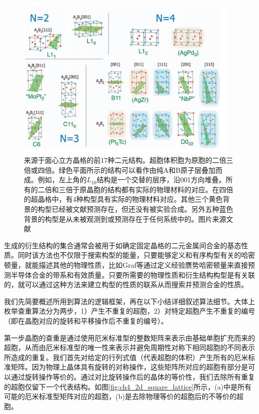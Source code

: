 \begin{figure}
  \includegraphics[width=0.96\textwidth]{figs/ch4_fcc_234_ss.png}
  \centering
  \caption{来源于面心立方晶格的前17种二元结构。超胞体积胞为原胞的二倍三倍或四倍。绿色平面所示的结构可以看作由纯A和B原子层叠加而成。例如，左上角的$L_{10}$结构是一个交替的层序，沿001方向堆叠。所有的二倍和三倍于原晶胞的结构都有实际的物理材料的对应。在四倍的超晶格中，有4种构型具有实际的物理材料对应。其他三个黄色背景的构型已经被文献\cite{curtarolo2005accuracy}预测存在，但还没有被实验合成。另外五种蓝色背景的构型是从未被观测到或预测存在于任何系统中的。图片来源文献\cite{hart2008algorithm}}
  \label{fig:ch4_fcc_234_ss}
\end{figure}

生成的衍生结构的集合通常会被用于如确定固定晶格的二元金属间合金的基态性质。同时该方法也不仅限于搜索构型的能量，只要能够定义和有序构型有关的哈密顿量，就能描述其他的物理性质，比如Graf等\cite{graf2005direct}通过定义经验赝势哈密顿量来直接预测半导体合金的带系和有效质量。只要所需要的物理性质和衍生结构构型是有关联的，就可以通过这种方法来建立构型的性质的联系从而搜索并预测合金的性质。

我们先简要概述所用到算法的逻辑框架，再在以下小结详细叙述算法细节。大体上枚举查重算法分为两步，1）产生不重复的超胞，2）对特定超胞产生不重复的编号（即在晶胞对应的旋转和平移操作后不重复的编号）。

第一步晶胞的查重是通过使用厄米标准型的整数矩阵来表示由基础单胞扩充而来的超胞，从而由厄米标准型的唯一性来表示并避免周期性对称下相同超胞的不同表示所造成的重复。我们首先对给定的行列式值（代表超胞的体积）产生所有的厄米标准矩阵。因为物理上晶体具有旋转的对称操作，这些矩阵所对应的超胞有部分是可以通过旋转操作等价的。通过对比旋转操作后的晶体的等价性，我们去除所有重复的超胞仅留下一个代表结构。如图\ref{fig:ch4_2d_square_lattice}所示，(a)中是所有可能的厄米标准型矩阵对应的超胞，(b)是去除物理等价的超胞后的不等价的超胞。

